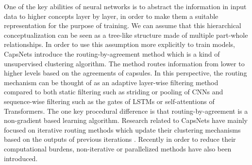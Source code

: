 \documentclass[review]{elsarticle}
\begin{document}
One of the key abilities of neural networks is to abstract the information in input data to higher concepts layer by layer, in order to make them a suitable representation for the purpose of training.
We can assume that this hierarchical conceptualization can be seen as a tree-like structure made of multiple part-whole relationships.
In order to use this assumption more explicitly to train models, CapsNets introduce the routing-by-agreement method which is a kind of unsupervised clustering algorithm.
The method routes information from lower to higher levels based on the agreements of capsules.
In this perspective, the routing mechanism can be thought of as an adaptive layer-wise filtering method compared to both static filtering such as striding or pooling of CNNs and sequence-wise filtering such as the gates of LSTMs or self-attentions of Transformers.
The one key procedural difference is that routing-by-agreement is a non-gradient based learning algorithm.
Research related to CapsNets have mainly focused on iterative routing methods which update their clustering mechanisms based on the outputs of previous iterations \citep{DBLP:conf/nips/SabourFH17, DBLP:conf/iclr/HintonSF18}.
Recently in order to reduce their computational burdens, non-iterative \citep{DBLP:conf/nips/HahnPK19} or parallelized \citep{DBLP:conf/iclr/TsaiSGS20} methods have also been introduced.
\end{document}

